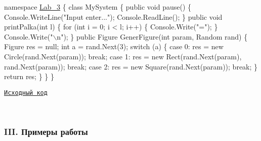 \begin{DoxyCode}
\textcolor{keyword}{namespace }\hyperlink{namespace_lab__3}{Lab\_3}
\{
    \textcolor{keyword}{class }MySystem
    \{
        \textcolor{keyword}{public} \textcolor{keywordtype}{void} pause()
        \{
            Console.WriteLine(\textcolor{stringliteral}{"Input enter..."});
            Console.ReadLine();
        \}
        \textcolor{keyword}{public} \textcolor{keywordtype}{void} printPalka(\textcolor{keywordtype}{int} l)
        \{
            \textcolor{keywordflow}{for} (\textcolor{keywordtype}{int} i = 0; i < l; i++)
            \{
                Console.Write(\textcolor{stringliteral}{"="});
            \}
            Console.Write(\textcolor{stringliteral}{"\(\backslash\)n"});
        \}
        \textcolor{keyword}{public} Figure GenerFigure(\textcolor{keywordtype}{int} param, Random rand)
        \{
            Figure res = null;
            \textcolor{keywordtype}{int} a = rand.Next(3);
            \textcolor{keywordflow}{switch} (a)
            \{
                \textcolor{keywordflow}{case} 0:
                    res = \textcolor{keyword}{new} Circle(rand.Next(param));
                    \textcolor{keywordflow}{break};
                \textcolor{keywordflow}{case} 1:
                    res = \textcolor{keyword}{new} Rect(rand.Next(param), rand.Next(param));
                    \textcolor{keywordflow}{break};
                \textcolor{keywordflow}{case} 2:
                    res = \textcolor{keyword}{new} Square(rand.Next(param));
                    \textcolor{keywordflow}{break};
            \}
            \textcolor{keywordflow}{return} res;
        \}
    \}
\}
\end{DoxyCode}


\href{Program.cs}{\tt Исходный код} 

~\newline


\subsubsection*{I\+II. Примеры работы}

~\newline
